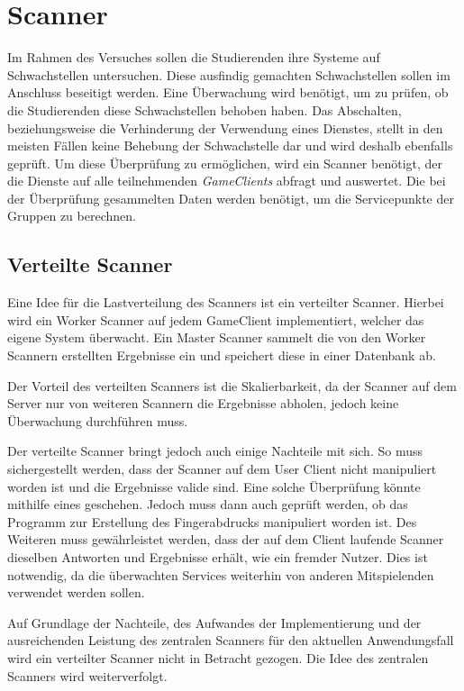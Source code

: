 \section{Scanner} \label{sec:Scanner}
Im Rahmen des Versuches sollen die Studierenden ihre Systeme auf Schwachstellen untersuchen. Diese ausfindig gemachten Schwachstellen sollen im Anschluss beseitigt werden. Eine Überwachung wird benötigt, um zu prüfen, ob die Studierenden diese Schwachstellen behoben haben. Das Abschalten, beziehungsweise die Verhinderung der Verwendung eines Dienstes, stellt in den meisten Fällen keine Behebung der Schwachstelle dar und wird deshalb ebenfalls geprüft. Um diese Überprüfung zu ermöglichen, wird ein Scanner benötigt, der die Dienste auf alle teilnehmenden \textit{GameClients} abfragt und auswertet. Die bei der Überprüfung gesammelten Daten werden benötigt, um die Servicepunkte der Gruppen zu berechnen.

\subsection{Verteilte Scanner}
Eine Idee für die Lastverteilung des Scanners ist ein verteilter Scanner. Hierbei wird ein Worker Scanner auf jedem GameClient implementiert, welcher das eigene System überwacht. Ein Master Scanner sammelt die von den Worker Scannern erstellten Ergebnisse ein und speichert diese in einer Datenbank ab. 

Der Vorteil des verteilten Scanners ist die Skalierbarkeit, da der Scanner auf dem Server nur von weiteren Scannern die Ergebnisse abholen, jedoch keine Überwachung durchführen muss.

Der verteilte Scanner bringt jedoch auch einige Nachteile mit sich. So muss sichergestellt werden, dass der Scanner auf dem User Client nicht manipuliert worden ist und die Ergebnisse valide sind. Eine solche Überprüfung könnte mithilfe eines  geschehen. Jedoch muss dann auch geprüft werden, ob das Programm zur Erstellung des Fingerabdrucks manipuliert worden ist.   Des Weiteren muss gewährleistet werden, dass der auf dem Client laufende Scanner dieselben Antworten und Ergebnisse erhält, wie ein fremder Nutzer. Dies ist notwendig, da die überwachten Services weiterhin von anderen Mitspielenden verwendet werden sollen.

Auf Grundlage der Nachteile, des Aufwandes der Implementierung und der ausreichenden Leistung des zentralen Scanners für den aktuellen Anwendungsfall wird ein verteilter Scanner nicht in Betracht gezogen. Die Idee des zentralen Scanners wird weiterverfolgt.

